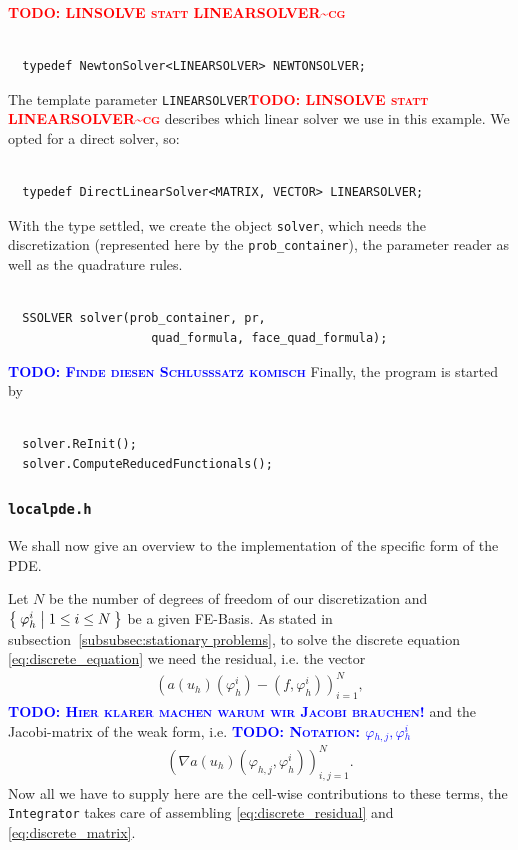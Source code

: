 \documentclass[prodmode,acmtoms]{acmsmall}
\numberwithin{equation}{section}
\renewcommand{\phi}{\varphi}
\newcommand{\todo}[1]{\textbf{\textsc{\textcolor{blue}{TODO: #1}}}}
\newcommand{\todocg}[1]{\textbf{\textsc{\textcolor{red}{TODO: #1\textasciitilde cg}}}}
\begin{document}
\todocg{LINSOLVE statt LINEARSOLVER}
\begin{lstlisting}
  
  typedef NewtonSolver<LINEARSOLVER> NEWTONSOLVER;

\end{lstlisting}
The  template parameter \texttt{LINEARSOLVER}\todocg{LINSOLVE statt LINEARSOLVER} describes which linear solver we use in this example. We opted for a direct solver, so: 
\begin{lstlisting}
  
  typedef DirectLinearSolver<MATRIX, VECTOR> LINEARSOLVER;

\end{lstlisting}
With the type settled, we create the object \texttt{solver}, which needs the discretization (represented here by the \texttt{prob\_container}), the parameter reader as well as the quadrature rules.
\begin{lstlisting}

  SSOLVER solver(prob_container, pr,
                    quad_formula, face_quad_formula);

\end{lstlisting}
\todo{Finde diesen Schlusssatz komisch}
Finally, the program is started by
\begin{lstlisting}

  solver.ReInit();
  solver.ComputeReducedFunctionals();

\end{lstlisting}

\subsubsection{\texttt{localpde.h}}
We shall now give an overview to the implementation of the specific form of the PDE. 

Let $N$ be the number of degrees of freedom of our discretization and $\Set{\phi_{h}^{i}|1\leq i \leq N}$ be a given FE-Basis. As stated in subsection~\ref{subsubsec:stationary problems}, to solve the discrete equation \eqref{eq:discrete_equation} we need the residual, i.e. the vector
\begin{align}\label{eq:discrete_residual}
\left(a(u_h)(\phi_{h}^{i})-(f,\phi_{h}^{i})\right)_{i=1}^N,
\end{align}
\todo{Hier klarer machen warum wir Jacobi brauchen!}
and the Jacobi-matrix of the weak form, i.e.
\todo{Notation: $\phi_{h,j},\phi_{h}^{i}$}
\begin{align}\label{eq:discrete_matrix}
\left(\nabla a(u_h)(\phi_{h,j},\phi_{h}^{i})\right)_{i,j=1}^N.
\end{align}
Now all we have to supply here are the cell-wise contributions to these terms, the \texttt{Integrator} takes care of assembling \eqref{eq:discrete_residual} and \eqref{eq:discrete_matrix}.
\end{document}
